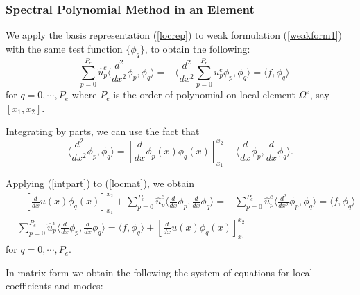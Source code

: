 \subsubsection{Spectral Polynomial Method in an Element}

We apply the basis representation (\ref{locrep}) to weak
formulation (\ref{weakform1}) with the same test function
$\{\phi_q\}$, to obtain the following:
\begin{equation}\label{locmat}
 - \sum_{p=0}^{P_e} \hat u_p^e \langle \frac{d^2}{dx^2} \phi_p, \phi_q \rangle = - \langle \frac{d^2}{dx^2} \sum_{p=0}^{P_e} u_p^e \phi_p, \phi_q \rangle = \langle f, \phi_q \rangle
\end{equation}
for $q = 0, \cdots, P_e$ where $P_e$ is the order of polynomial on local element $\Omega^{e}$, say $\left[ x_1, x_2 \right]$.

Integrating by parts, we can use the fact that
\begin{equation}\label{intpart}
\langle \frac{d^2}{dx^2} \phi_p, \phi_q \rangle = \left[ \frac{d}{dx}\phi_p(x) \phi_q(x) \right]_{x_1}^{x_2} - \langle \frac{d}{dx} \phi_p, \frac{d}{dx} \phi_q \rangle.
\end{equation}

Applying (\ref{intpart}) to (\ref{locmat}), we obtain
\begin{eqnarray}\label{locmat2}
&- \left[\frac{d}{dx}u(x)\phi_q(x) \right]_{x_1}^{x_2} + \sum_{p=0}^{P_e} \hat u_p^e \langle \frac{d}{dx} \phi_p, \frac{d}{dx} \phi_q \rangle
= - \sum_{p=0}^{P_e} \hat u_p^e \langle \frac{d^2}{dx^2} \phi_p, \phi_q \rangle  = \langle f, \phi_q \rangle \\
&\sum_{p=0}^{P_e} \hat u_p^e \langle \frac{d}{dx} \phi_p, \frac{d}{dx} \phi_q \rangle = \langle f, \phi_q \rangle + \left[\frac{d}{dx}u(x)\phi_q(x) \right]_{x_1}^{x_2}
\end{eqnarray}
for $q = 0, \cdots, P_e$.

In matrix form we obtain the following the system of equations for local coefficients and modes:

